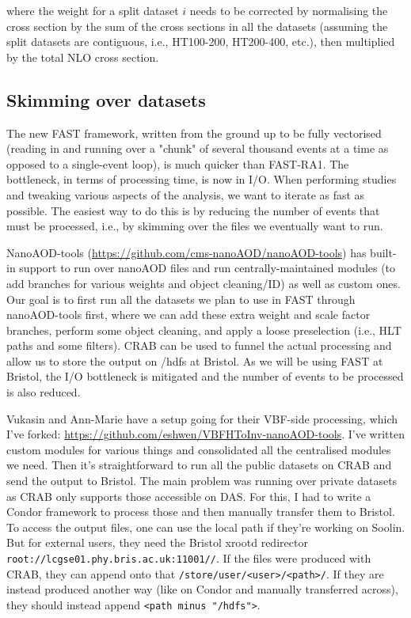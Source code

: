 where the weight for a split dataset $i$ needs to be corrected by normalising the cross section by the sum of the cross sections in all the datasets (assuming the split datasets are contiguous, i.e., HT100-200, HT200-400, etc.), then multiplied by the total NLO cross section.


\subsection{Skimming over datasets}
The new FAST framework, written from the ground up to be fully vectorised (reading in and running over a "chunk" of several thousand events at a time as opposed to a single-event loop), is much quicker than FAST-RA1. The bottleneck, in terms of processing time, is now in I/O. When performing studies and tweaking various aspects of the analysis, we want to iterate as fast as possible. The easiest way to do this is by reducing the number of events that must be processed, i.e., by skimming over the files we eventually want to run.

NanoAOD-tools (\url{https://github.com/cms-nanoAOD/nanoAOD-tools}) has built-in support to run over nanoAOD files and run centrally-maintained modules (to add branches for various weights and object cleaning/ID) as well as custom ones. Our goal is to first run all the datasets we plan to use in FAST through nanoAOD-tools first, where we can add these extra weight and scale factor branches, perform some object cleaning, and apply a loose preselection (i.e., HLT paths and some filters). CRAB can be used to funnel the actual processing and allow us to store the output on /hdfs at Bristol. As we will be using FAST at Bristol, the I/O bottleneck is mitigated and the number of events to be processed is also reduced.

Vukasin and Ann-Marie have a setup going for their VBF-side processing, which I've forked: \url{https://github.com/eshwen/VBFHToInv-nanoAOD-tools}. I've written custom modules for various things and consolidated all the centralised modules we need. Then it's straightforward to run all the public datasets on CRAB and send the output to Bristol. The main problem was running over private datasets as CRAB only supports those accessible on DAS. For this, I had to write a Condor framework to process those and then manually transfer them to Bristol. To access the output files, one can use the local path if they're working on Soolin. But for external users, they need the Bristol xrootd redirector \texttt{root://lcgse01.phy.bris.ac.uk:11001//}. If the files were produced with CRAB, they can append onto that \texttt{/store/user/<user>/<path>/}. If they are instead produced another way (like on Condor and manually transferred across), they should instead append \texttt{<path minus "/hdfs">}.


